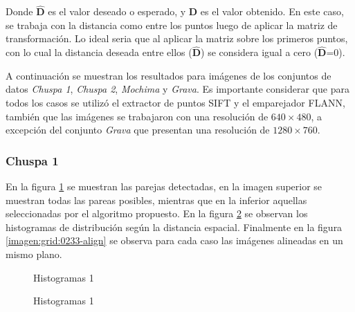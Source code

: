 Donde $\hat{\mathbf{D}}$ es el valor deseado o esperado, y $\mathbf{D}$ es el valor obtenido. En este caso, se trabaja con la distancia como entre los puntos luego de aplicar la matriz de transformación. Lo ideal seria que al aplicar la matriz sobre los primeros puntos, con lo cual la distancia deseada entre ellos ($\hat{\mathbf{D}}$) se considera igual a cero ($\hat{\mathbf{D}}$=0).

A continuación se muestran los resultados para imágenes de los conjuntos de datos \textit{Chuspa 1}, \textit{Chuspa 2}, \textit{Mochima} y \textit{Grava}. Es importante considerar que para todos los casos se utilizó el extractor de puntos SIFT y el emparejador FLANN, también que las imágenes se trabajaron con una resolución de $640 \times 480$, a excepción del conjunto \textit{Grava} que presentan una resolución de $1280 \times 760$.

\subsubsection*{Chuspa 1}

En la figura \ref{imagen:grid:0233-match} se muestran las parejas detectadas, en la imagen superior se muestran todas las pareas posibles, mientras que en la inferior aquellas seleccionadas por el algoritmo propuesto. En la figura \ref{imagen:grid:0233-hist} se observan los histogramas de distribución según la distancia espacial. Finalmente en la figura \ref{imagen:grid:0233-align} se observa para cada caso las imágenes alineadas en un mismo plano.

\begin{figure}[h]
	\centering     %
	\hspace{1mm}%
	
	\caption[Histogramas 1]{Histogramas 1}
	\label{imagen:grid:0233-match}
\end{figure}

\begin{figure}[h]
	\centering     %
	\hspace{3mm}%
	
	\caption[Histogramas 1]{Histogramas 1}
	\label{imagen:grid:0233-hist}
\end{figure}

